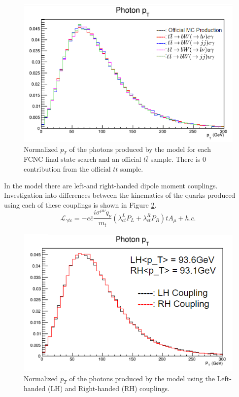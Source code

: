\begin{figure}[h!]
	\centering
	\includegraphics[width=.8\columnwidth]{../ThesisImages/FCNCValidation/photon.png}
	\caption{Normalized $p_T$ of the photons produced by the model for each FCNC final state search and an official $t\bar{t}$ sample.  There is 0 contribution from the official $t\bar{t}$ sample.
	}
	\label{fig:photonValidation}
\end{figure}

In the model there are left-and right-handed dipole moment couplings.  Investigation into differences between the kinematics of the quarks produced using each of these couplings is shown in Figure \ref{fig:LHRHcomp}.
\[ \mathcal{L}_{\gamma t c} = -e \bar{c} \frac{i\sigma^{\mu\nu}q_\nu}{m_t}(\lambda^L_{ct}P_L+\lambda^R_{ct}P_R )t A_\mu + h.c. \]

\begin{figure}[h!]
	\centering
	\includegraphics[width=.8\columnwidth]{../ThesisImages/FCNCValidation/PhotonLHRH.png}
	\caption{ Normalized $p_T$ of the photons produced by the model using the Left-handed (LH) and Right-handed (RH) couplings.
	}
	\label{fig:LHRHcomp}
\end{figure}

